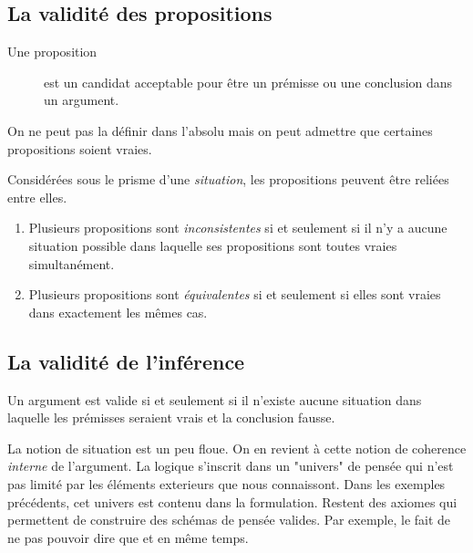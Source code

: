\documentclass[fleqn,a4paper,nobib]{tufte-handout}
\begin{document}
\subsection{La validité des propositions}

\begin{description}
    \item[Une proposition] est un candidat acceptable pour être un prémisse ou
    une conclusion dans un argument.
\end{description}

On ne peut pas la définir dans l'absolu mais on peut admettre
que certaines propositions soient vraies.


Considérées sous le prisme d'une \textit{situation}, les propositions
peuvent être reliées entre elles.

\begin{enumerate}[label=\arabic*.]
    \item Plusieurs propositions sont \textit{inconsistentes} si et seulement si
    il n'y a aucune situation possible dans laquelle ses propositions
    sont toutes vraies simultanément.
    \item Plusieurs propositions sont \textit{équivalentes} si et seulement si
    elles sont vraies dans exactement les mêmes cas. 
\end{enumerate}

\subsection{La validité de l'inférence}

\begin{displayquote}
    Un argument est valide si et seulement si il n'existe aucune situation
    dans laquelle les prémisses seraient vrais et la conclusion fausse.
\end{displayquote}

La notion de situation est un peu floue. 
On en revient à cette notion de coherence \textit{interne} de l'argument.
La logique s'inscrit dans un "univers" de pensée qui n'est pas limité
par les éléments exterieurs que nous connaissont. Dans les exemples
précédents, cet univers est contenu dans la formulation. Restent des
axiomes qui permettent de construire des schémas de pensée valides.
Par exemple, le fait de ne pas pouvoir dire que 
et  en même temps.
\end{document}

